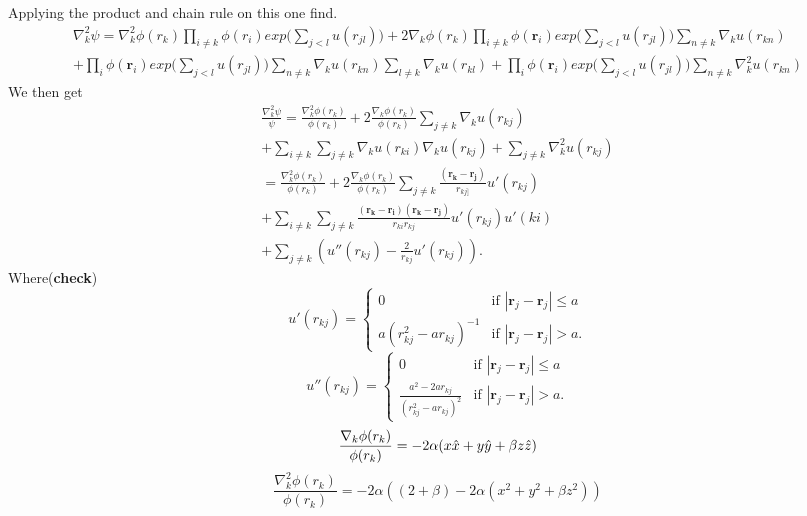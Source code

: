 \documentclass{article}
\begin{document}
Applying the product and chain rule on this one find.
\begin{equation*}
\begin{split}
    \nabla_k^2 \psi = \nabla_k^2 \phi(r_k) \prod_{i \neq k} \phi(r_i)exp\big(\sum_{j<l}u(r_{jl})\big)  +2 \nabla_k \phi(r_k) \prod_{i\neq k} \phi(\boldsymbol{r}_i)  exp\big(\sum_{j<l}u(r_{jl})\big) \sum_{n\neq k}\nabla_k u(r_{kn})
 \\ + \prod_i \phi(\boldsymbol{r}_i) exp\big(\sum_{j<l}u(r_{jl})\big) \sum_{n\neq k}\nabla_k u(r_{kn}) \sum_{l\neq k}\nabla_k u(r_{kl}) +
 \prod_i \phi(\boldsymbol{r}_i) exp\big(\sum_{j<l}u(r_{jl})\big) \sum_{n\neq k}\nabla_k^2 u(r_{kn})
\end{split}
\end{equation*}
We then get
\begin{equation*}
\begin{split}
\frac{\nabla_k^2 \psi}{\psi} =\frac{\nabla_k^2 \phi(r_k)}{\phi(r_k)}+ 2\frac{\nabla_k \phi(r_k)}{\phi(r_k)} \sum_{j \neq k} \nabla_k u(r_{kj}) \\ + \sum_{i \neq k}\sum_{j \neq k} \nabla_k u(r_{ki}) \nabla_k u(r_{kj}) + \sum_{j \neq k} \nabla_k^2 u(r_{kj}) \\
= \frac{\nabla_k^2 \phi(r_k)}{\phi(r_k)}+ 2\frac{\nabla_k \phi(r_k)}{\phi(r_k)} \sum_{j \neq k} \frac{(\boldsymbol{r_k}-\boldsymbol{r_j})}{r_{kj]}} u'(r_{kj}) \\
+ \sum_{i \neq k} \sum_{j \neq k} \frac{(\boldsymbol{r_k}-\boldsymbol{r_i})(\boldsymbol{r_k}-\boldsymbol{r_j})}{r_{ki}r_{kj}} u'(r_{kj})u'(ki) \\
 +\sum_{j \neq k}(u''(r_{kj}) - \frac{2}{r_{kj}} u'(r_{kj})).
\end{split}
\end{equation*}
Where(\textbf{check})
\[
u'(r_{kj}) =
\begin{cases}
    0 & \text{if } |\boldsymbol{r}_j - \boldsymbol{r}_j| \leq  a \\
    a(r_{kj}^2 -ar_{kj})^{-1}& \text{if } |\boldsymbol{r}_j - \boldsymbol{r}_j| >  a.
\end{cases}
\]
\[
u''(r_{kj}) =
\begin{cases}
    0 & \text{if } |\boldsymbol{r}_j - \boldsymbol{r}_j| \leq  a \\
    \frac{a^2 -2ar_{kj}}{(r_{kj}^2 -ar_{kj})^2}    & \text{if } |\boldsymbol{r}_j - \boldsymbol{r}_j| >  a.
\end{cases}
\]
$$ \frac{\nabla_k \phi(r_k)}{\phi(r_k)} = -2\alpha(x\Hat{x}+y\Hat{y}+\beta z\Hat{z})$$
$$ \frac{\nabla_k^2 \phi(r_k)}{\phi(r_k)} = -2\alpha( (2+\beta) -2\alpha(x^2+y^2+\beta z^2))$$


\end{document}
